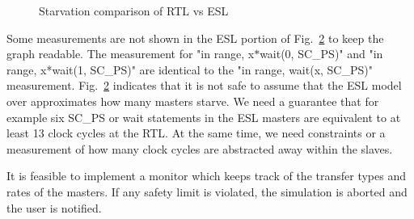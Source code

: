 \begin{figure}[hbt]
\begin{subfigure}{.5\textwidth}
  \label{fig:sub2}
\end{subfigure}
\caption{Starvation comparison of RTL vs ESL}
\label{fig:starvation}
\end{figure}

Some measurements are not shown in the ESL portion of Fig.~\ref{fig:starvation} to keep the graph readable. The measurement for "in range, x$*$wait(0, SC\_PS)" and "in range, x*wait(1, SC\_PS)"  are identical to the "in range, wait(x, SC\_PS)" measurement. 
Fig.~\ref{fig:starvation} indicates that it is not safe to assume that the ESL model over approximates how many masters starve. We need a guarantee that for example
six SC\_PS or wait statements in the ESL masters are equivalent to at least 13 clock cycles at the RTL. At the same time, we need constraints or a measurement of
how many clock cycles are abstracted away within the slaves. \par
It is feasible to implement a monitor which keeps track of the transfer types and rates of the masters. If any safety limit is violated, the simulation is aborted 
and the user is notified.
  

